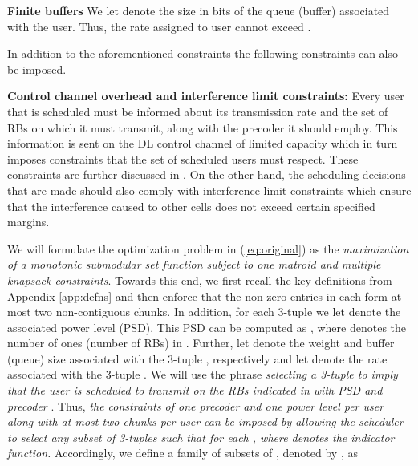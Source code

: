 \documentclass[11pt] {article}
\begin{document}
 \textbf{Finite buffers} We let   denote the size in bits  of the queue (buffer)  associated with the  user. Thus, the rate  assigned to user  cannot exceed .

In addition to the aforementioned constraints the following constraints can also be imposed.

 \textbf{Control channel overhead and interference limit constraints:} Every user that is  scheduled  must be informed about its transmission rate and the set of RBs on which it must transmit, along with the precoder it should employ. This information is sent on the DL control channel of limited capacity which in turn imposes constraints that the set of  scheduled users must respect. These constraints are further discussed in \cite{prasad:wiopt12}. On the other hand, the scheduling decisions that are made should also comply with interference limit constraints which ensure that the  interference caused to other cells does not exceed certain specified margins. 



























We will formulate the optimization problem in (\ref{eq:original}) as the {\em maximization of a monotonic submodular set function subject to one matroid and multiple knapsack   constraints}. Towards this end,  we first recall the key definitions from Appendix \ref{app:defns} and then
  enforce that   the non-zero entries in each  form at-most two non-contiguous chunks.
In addition, for each 3-tuple  we let  denote the associated power level (PSD).  This PSD can be computed as , where  denotes the number of ones (number of RBs) in . Further, let   denote the weight  and buffer (queue) size associated with the 3-tuple , respectively and let  denote the rate associated with the 3-tuple . We will use the phrase {\em selecting a 3-tuple  to imply that
the user  is scheduled to transmit on the RBs indicated in  with PSD  and
 precoder }. Thus,  {\em the constraints of one precoder and one power level per user
 along with at most two chunks per-user can be imposed by allowing the scheduler to select any subset of 3-tuples  such that  for each , where  denotes the indicator function.}
  Accordingly, we define   a family of subsets of , denoted by , as
  
\end{document}
